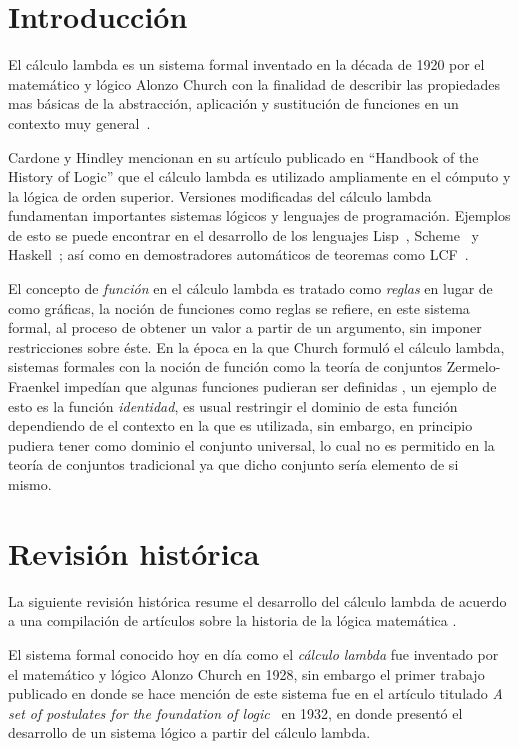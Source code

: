\section{Introducción}

El cálculo lambda es un sistema formal inventado en la década de 1920 por el
matemático y lógico Alonzo Church con la finalidad de describir las propiedades
mas básicas de la abstracción, aplicación y sustitución de funciones en un
contexto muy general~\cite{CardoneHindley:History}.\

Cardone y Hindley mencionan en su artículo publicado en ``Handbook of the
History of Logic'' que el cálculo lambda es utilizado ampliamente en el cómputo
y la lógica de orden superior. Versiones modificadas del cálculo lambda
fundamentan importantes sistemas lógicos y lenguajes de programación. Ejemplos
de esto se puede encontrar en el desarrollo de los lenguajes
Lisp~\cite{Lisp:first}, Scheme~\cite{Scheme:first} y Haskell~\cite{Haskell:first};
así como en demostradores automáticos de teoremas como LCF~\cite{ML:first}.\

El concepto de \emph{función} en el cálculo lambda es tratado como \emph{reglas}
en lugar de como gráficas, la noción de funciones como reglas se refiere, en
este sistema formal, al proceso de obtener un valor a partir de un argumento,
sin imponer restricciones sobre éste. En la época en la que Church formuló el
cálculo lambda, sistemas formales con la noción de función como la teoría de
conjuntos Zermelo-Fraenkel impedían que algunas funciones pudieran ser definidas
\cite{Barendregt:Bible}, un ejemplo de esto es la función \emph{identidad}, es
usual restringir el dominio de esta función dependiendo de el contexto en la que
es utilizada, sin embargo, en principio pudiera tener como dominio el conjunto
universal, lo cual no es permitido en la teoría de conjuntos tradicional ya que
dicho conjunto sería elemento de si mismo.\

\section{Revisión histórica}
La siguiente revisión histórica resume el desarrollo del cálculo lambda de
acuerdo a una compilación de artículos sobre la historia de la lógica matemática
\cite{CardoneHindley:History}.\

El sistema formal conocido hoy en día como el \emph{cálculo lambda} fue inventado por
el matemático y lógico Alonzo Church en 1928, sin embargo el primer
trabajo publicado en donde se hace mención de este sistema fue en el
artículo titulado \emph{A set of postulates for the foundation of
  logic}~\cite{Church:FoundationsLogic} en 1932, en donde presentó el desarrollo
de un sistema lógico a partir del cálculo lambda.\

